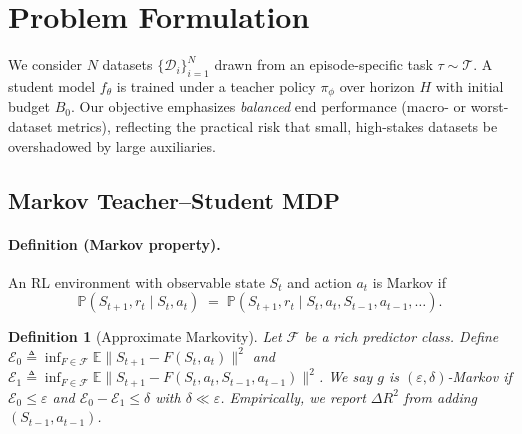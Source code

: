 \documentclass[11pt]{article}
\newtheorem{definition}{Definition}
\newcommand{\E}{\mathbb{E}}
\newcommand{\1}{\mathbf{1}}
\newcommand{\Prb}{\mathbb{P}}
\begin{document}
\section{Problem Formulation}
We consider $N$ datasets $\{\mathcal{D}_i\}_{i=1}^N$ drawn from an episode-specific task $\tau\sim\mathcal{T}$. A student model $f_\theta$ is trained under a teacher policy $\pi_\phi$ over horizon $H$ with initial budget $B_0$. Our objective emphasizes \emph{balanced} end performance (macro- or worst-dataset metrics), reflecting the practical risk that small, high-stakes datasets be overshadowed by large auxiliaries.

\subsection{Markov Teacher--Student MDP}\label{sec:mdp}
\paragraph{Definition (Markov property).}
An RL environment with observable state $S_t$ and action $a_t$ is Markov if
\begin{equation}
\Prb(S_{t+1},r_t \mid S_t,a_t) \;=\; \Prb(S_{t+1},r_t \mid S_t,a_t,S_{t-1},a_{t-1},\dots).
\label{eq:markov}
\end{equation}

\begin{definition}[Approximate Markovity]
\label{def:approx-markov-tight}
Let $\mathcal{F}$ be a rich predictor class. Define
$\mathcal{E}_0 \triangleq \inf_{F\in\mathcal{F}} \E\| S_{t+1} - F(S_t,a_t)\|^2$
and
$\mathcal{E}_1 \triangleq \inf_{F\in\mathcal{F}} \E\| S_{t+1} - F(S_t,a_t,S_{t-1},a_{t-1})\|^2$.
We say $g$ is $(\varepsilon,\delta)$-Markov if $\mathcal{E}_0 \le \varepsilon$ and
$\mathcal{E}_0 - \mathcal{E}_1 \le \delta$ with $\delta \ll \varepsilon$.
Empirically, we report $\Delta R^2$ from adding $(S_{t-1},a_{t-1})$.
\end{definition}
\end{document}
